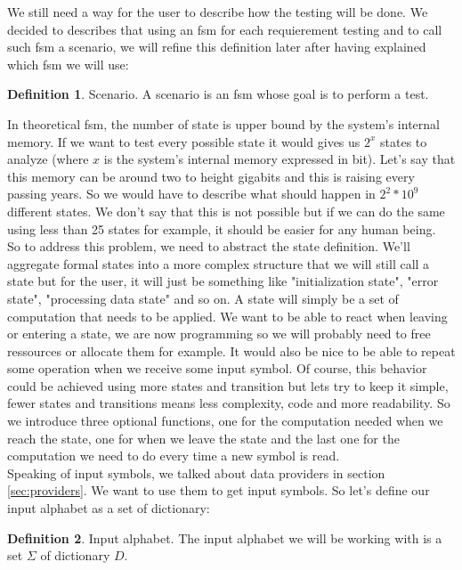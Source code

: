 \documentclass[12pt]{article}
\theoremstyle{definition}
\newtheorem{definition}{Definition}[section]
\theoremstyle{definition}
\theoremstyle{remark}
\begin{document}
We still need a way for the user to describe how the testing will be done. We decided to describes that using an \gls{fsm} for each requierement testing and to call such \gls{fsm} a scenario, we will refine this definition later after having explained which \gls{fsm} we will use:

\theoremstyle{definition}
\begin{definition}{Scenario.} A scenario is an \gls{fsm} whose goal is to perform a test.
\end{definition}

In theoretical \gls{fsm}, the number of state is upper bound by the system's internal memory. If we want to test every possible state it would gives us $2^x$ states to analyze (where $x$ is the system's internal memory expressed in bit). Let's say that this memory can be around two to height gigabits and this is raising every passing years. So we would have to describe what should happen in $2^2*10^9$ different states. We don't say that this is not possible but if we can do the same using less than 25 states for example, it should be easier for any human being.\\

So to address this problem, we need to abstract the state definition. We'll aggregate formal states into a more complex structure that we will still call a state but for the user, it will just be something like "initialization state", "error state", "processing data state" and so on. A state will simply be a set of computation that needs to be applied.
We want to be able to react when leaving or entering a state, we are now programming so we will probably need to free ressources or allocate them for example. It would also be nice to be able to repeat some operation when we receive some input symbol. Of course, this behavior could be achieved using more states and transition but lets try to keep it simple, fewer states and transitions means less complexity, code and more readability. So we introduce three optional functions, one for the computation needed when we reach the state, one for when we leave the state and the last one for the computation we need to do every time a new symbol is read.\\

Speaking of input symbols, we talked about data providers in section \ref{sec:providers}. We want to use them to get input symbols. So let's define our input alphabet as a set of dictionary:

\theoremstyle{definition}
\begin{definition}{Input alphabet.} The input alphabet we will be working with is a set $\Sigma$ of dictionary $D$.
\end{definition}
\end{document}
